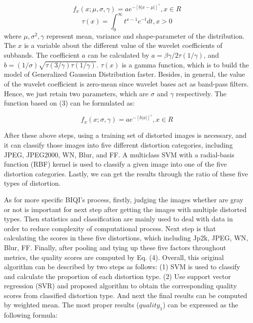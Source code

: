 \begin{equation}
f_{x}\left ( x;\mu ,\sigma ,\gamma \right ) = ae^{-[b|x-\mu|]^{\gamma }}, x\in R
\end{equation}
\begin{equation}
\tau (x) = \int_{0}^{\infty }t^{x-1}e^{-t}dt, x>0
\end{equation}
where $\mu,\sigma^{2}, \gamma$ represent mean, variance and shape-parameter of the distribution. The $x$ is a variable about the different value of the wavelet coefficients of subbands. The coefficient $a$ can be calculated by $a = \beta \gamma /2\tau(1/\gamma)$, and $b = (1/\sigma ) \sqrt{\tau (3/\gamma )\tau (1/\gamma )}$. $\tau (x)$ is a gamma function, which is to build the model of Generalized Gaussian Distribution faster. Besides, in general, the value of the wavelet coefficient is zero-mean since wavelet bases act as band-pass filters. Hence, we just retain two parameters, which are  $\sigma$ and $\gamma$ respectively. The function based on (3) can be formulated as: 

\begin{equation}
f_{x}\left ( x;\sigma ,\gamma \right ) = ae^{-[b|x|]^{\gamma }}, x\in R
\end{equation}

After these above steps, using a training set of distorted images is necessary, and it can classify those images into five different distortion categories, including JPEG, JPEG2000, WN, Blur, and FF. A multiclass SVM with a radial-basis function (RBF) kernel is used to classify a given image into one of the five distortion categories. Lastly, we can get the results through the ratio of these five types of distortion.

As for more specific BIQI's process, firstly, judging the images whether are gray or not  is important for next step after getting the images with multiple distorted types. Then statistics and classification are mainly used to deal with data in order to reduce complexity of computational process. Next step is that calculating the scores in these five distortions, which including Jp2k, JPEG, WN, Blur, FF. Finally, after pooling and tying up these five factors throughout metrics, the quality scores are computed by Eq. (4). 
Overall, this original algorithm can be described by two steps as follows:
(1) SVM is used to classify and calculate the proportion of each distortion type.
(2) Use support vector regression (SVR) and proposed algorithm to obtain the corresponding quality scores from classified distortion type. And next the final results can be computed by weighted mean.
The most proper results ($quality_1$) can be expressed as the following formula:


